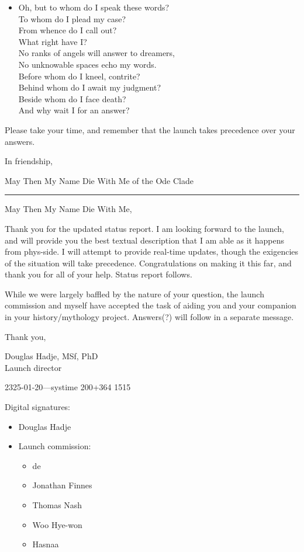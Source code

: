 \begin{itemize}
\item
  Oh, but to whom do I speak these words?\\
  To whom do I plead my case?\\
  From whence do I call out?\\
  What right have I?\\
  No ranks of angels will answer to dreamers,\\
  No unknowable spaces echo my words.\\
  Before whom do I kneel, contrite?\\
  Behind whom do I await my judgment?\\
  Beside whom do I face death?\\
  And why wait I for an answer?
\end{itemize}

Please take your time, and remember that the launch takes precedence over your answers.

In friendship,

May Then My Name Die With Me of the Ode Clade

\begin{center}\rule{0.5\linewidth}{0.5pt}\end{center}

May Then My Name Die With Me,

Thank you for the updated status report. I am looking forward to the launch, and will provide you the best textual description that I am able as it happens from phys-side. I will attempt to provide real-time updates, though the exigencies of the situation will take precedence. Congratulations on making it this far, and thank you for all of your help. Status report follows.

While we were largely baffled by the nature of your question, the launch commission and myself have accepted the task of aiding you and your companion in your history/mythology project. Answers(?) will follow in a separate message.

Thank you,

Douglas Hadje, MSf, PhD\\
Launch director

2325-01-20---systime 200+364 1515

Digital signatures:

\begin{itemize}
\tightlist
\item
  Douglas Hadje
\item
  Launch commission:

  \begin{itemize}
  \tightlist
  \item
    de
  \item
    Jonathan Finnes
  \item
    Thomas Nash
  \item
    Woo Hye-won
  \item
    Hasnaa
  \end{itemize}
\end{itemize}

